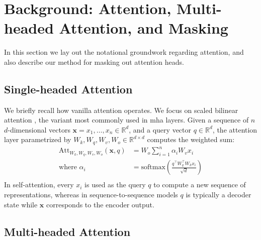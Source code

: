 \section{Background: Attention, Multi-headed Attention, and Masking}
\label{sec:multi_headed_attention}

In this section we lay out the notational groundwork regarding attention, and also describe our method for masking out attention heads.



\subsection{Single-headed Attention}

We briefly recall how vanilla attention operates. 
We focus on scaled bilinear attention \citep{luong2015effective}, the variant most commonly used in \ac{mha} layers.
Given a sequence of $n$ $d$-dimensional vectors $\mathbf{x}=x_1,\ldots,x_n\in \mathbb{R}^d$, and a query vector $q\in \mathbb{R}^d$, the attention layer parametrized by $W_k, W_q, W_v, W_o\in\mathbb{R}^{d\times d}$ computes the weighted sum:
\begin{equation*}
\begin{split}
    \text{Att}_{W_k, W_q, W_v, W_o}(\textbf{x}, q)&=W_o\sum_{i=1}^n\alpha_iW_vx_i\\
    \text{where  }\alpha_i&=\text{softmax}\left(\frac{q^{\intercal}W_q^{\intercal}W_kx_i}{\sqrt{d}}\right)\\
\end{split}
\end{equation*}
In self-attention, every $x_i$ is used as the query $q$ to compute a new sequence of representations, whereas in sequence-to-sequence models $q$ is typically a decoder state while $\mathbf{x}$ corresponds to the encoder output. 

\subsection{Multi-headed Attention}

